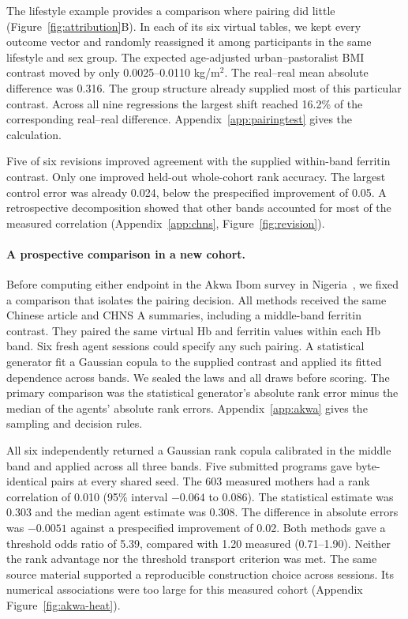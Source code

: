 \documentclass[sigconf,anonymous,review]{acmart}
\begin{document}
The lifestyle example provides a comparison where pairing did little (Figure~\ref{fig:attribution}B). In each of its six virtual tables, we kept every outcome vector and randomly reassigned it among participants in the same lifestyle and sex group. The expected age-adjusted urban--pastoralist BMI contrast moved by only 0.0025--0.0110 kg/m$^2$. The real--real mean absolute difference was 0.316. The group structure already supplied most of this particular contrast. Across all nine regressions the largest shift reached 16.2\% of the corresponding real--real difference. Appendix~\ref{app:pairingtest} gives the calculation.



Five of six revisions improved agreement with the supplied within-band ferritin contrast. Only one improved held-out whole-cohort rank accuracy. The largest control error was already 0.024, below the prespecified improvement of 0.05. A retrospective decomposition showed that other bands accounted for most of the measured correlation (Appendix~\ref{app:chns}, Figure~\ref{fig:revision}).

\paragraph{A prospective comparison in a new cohort.}
Before computing either endpoint in the Akwa Ibom survey in Nigeria~\cite{akwa_iron}, we fixed a comparison that isolates the pairing decision. All methods received the same Chinese article and CHNS A summaries, including a middle-band ferritin contrast. They paired the same virtual Hb and ferritin values within each Hb band. Six fresh agent sessions could specify any such pairing. A statistical generator fit a Gaussian copula to the supplied contrast and applied its fitted dependence across bands. We sealed the laws and all draws before scoring. The primary comparison was the statistical generator's absolute rank error minus the median of the agents' absolute rank errors. Appendix~\ref{app:akwa} gives the sampling and decision rules.

All six independently returned a Gaussian rank copula calibrated in the middle band and applied across all three bands. Five submitted programs gave byte-identical pairs at every shared seed. The 603 measured mothers had a rank correlation of 0.010 (95\% interval $-0.064$ to 0.086). The statistical estimate was 0.303 and the median agent estimate was 0.308. The difference in absolute errors was $-0.0051$ against a prespecified improvement of 0.02. Both methods gave a threshold odds ratio of 5.39, compared with 1.20 measured (0.71--1.90). Neither the rank advantage nor the threshold transport criterion was met. The same source material supported a reproducible construction choice across sessions. Its numerical associations were too large for this measured cohort (Appendix Figure~\ref{fig:akwa-heat}).
\end{document}
